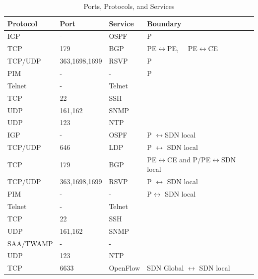 \begin{table}[ht]
\caption{Ports, Protocols, and Services}
\begin{tabular}{lllll}
\toprule
Protocol & Port & Service & Boundary &  \\ 
\midrule
IGP & - & OSPF & P &  \\
TCP & 179 & BGP & PE$\leftrightarrow{}$PE,$\quad$ PE$\leftrightarrow{}$CE &  \\
TCP/UDP & 363,1698,1699 & RSVP & P &  \\
PIM & - & - & P &  \\
Telnet & - & Telnet &  &  \\
TCP & 22 & SSH &  &  \\
UDP & 161,162 & SNMP &  &  \\
UDP & 123 & NTP &  &  \\ 
\midrule
IGP & - & OSPF & P $\leftrightarrow{}$SDN local &  \\
TCP/UDP & 646 & LDP & P $\leftrightarrow{}$ SDN local &  \\
TCP & 179 & BGP & PE$\leftrightarrow{}$CE and P/PE$\leftrightarrow{}$SDN local \\
TCP/UDP & 363,1698,1699 & RSVP & P $\leftrightarrow{}$ SDN local &  \\
PIM & - & - & P$\leftrightarrow{}$ SDN local &  \\
Telnet & - & Telnet &  &  \\
TCP & 22 & SSH &  &  \\
UDP & 161,162 & SNMP &  &  \\
SAA/TWAMP & - & - &  &  \\
UDP & 123 & NTP &  &  \\
TCP & 6633 & OpenFlow & SDN Global $\leftrightarrow{}$ SDN local &  \\
\bottomrule
\end{tabular}%
\label{tab:pps}
\end{table}